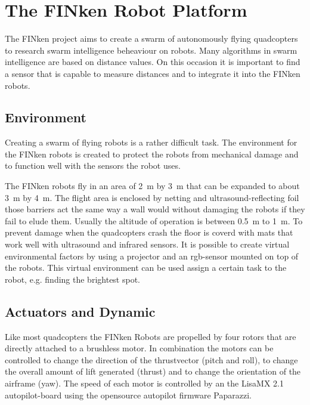 \section{The FINken Robot Platform}


The FINken project aims to create a swarm of autonomously flying quadcopters to research swarm intelligence beheaviour on robots.
Many algorithms in swarm intelligence are based on distance values. 
On this occasion it is important to find a sensor that is capable to measure distances and to integrate it into the FINken robots. 

\subsection{Environment}
Creating a swarm of flying robots is a rather difficult task.
The environment for the FINken robots is created to protect the robots from mechanical damage and to function well with the sensors the robot uses.

The FINken robots fly in an area of \SI{2}{\metre} by \SI{3}{\metre} that can be expanded to about \SI{3}{\metre} by \SI{4}{\metre}.
The flight area is enclosed by netting and ultrasound-reflecting foil those barriers act the same way a wall would without damaging the robots if they fail to elude them.
Usually the altitude of operation is between \SI{0.5}{\metre} to \SI{1}{\metre}.
To prevent damage when the quadcopters crash the floor is coverd with mats that work well with ultrasound and infrared sensors.
It is possible to create virtual environmental factors by using a projector and an rgb-sensor mounted on top of the robots.
This virtual environment can be used assign a certain task to the robot, e.g. finding the brightest spot.

\subsection{Actuators and Dynamic} 
Like most quadcopters the FINken Robots are propelled by four rotors that are directly attached to a brushless motor.
In combination the motors can be controlled to change the direction of the thrustvector (pitch and roll), to change the overall amount of lift generated (thrust) and to change the orientation of the airframe (yaw).
The speed of each motor is controlled by an the Lisa\/MX 2.1 autopilot-board\cite{_lisa/mx_????} using the opensource autopilot firmware Paparazzi\cite{_paparazziuav_????}.

